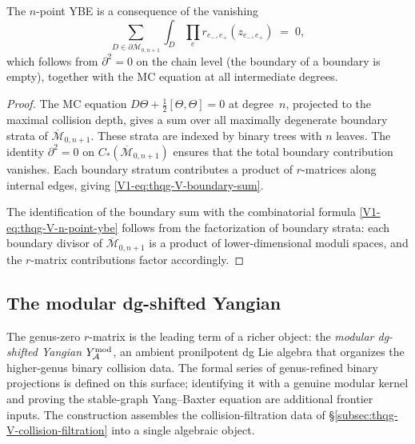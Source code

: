 \begin{proposition}
The $n$-point YBE is a consequence of the vanishing
\begin{equation}%
\sum_{D \in \partial\overline{\mathcal{M}}_{0,n+1}}
\int_D
\prod_{e}
r_{e_-,e_+}(z_{e_-,e_+})
\;=\; 0,
\end{equation}
which follows from $\partial^2 = 0$ on the chain level
\textup{(}the boundary of a boundary is empty\textup{)}, together
with the MC equation at all intermediate degrees.
\end{proposition}

\begin{proof}
The MC equation $D\Theta + \tfrac{1}{2}[\Theta,\Theta] = 0$ at
degree~$n$, projected to the maximal collision depth, gives a sum over
all maximally degenerate boundary strata of
$\overline{\mathcal{M}}_{0,n+1}$. These strata are indexed by binary
trees with $n$ leaves. The identity $\partial^2 = 0$ on
$C_*(\overline{\mathcal{M}}_{0,n+1})$ ensures that the total
boundary contribution vanishes. Each boundary stratum contributes a
product of $r$-matrices along internal edges, giving
\eqref{V1-eq:thqg-V-boundary-sum}.

The identification of the boundary sum with the combinatorial formula
\eqref{V1-eq:thqg-V-n-point-ybe} follows from the factorization of
boundary strata: each boundary divisor of $\overline{\mathcal{M}}_{0,n+1}$
is a product of lower-dimensional moduli spaces, and the $r$-matrix
contributions factor accordingly.
\end{proof}


%
%

\subsection{The modular dg-shifted Yangian}

The genus-zero $r$-matrix is the leading term of a richer object:
the \emph{modular dg-shifted Yangian} $Y^{\mathrm{mod}}_{\mathcal{A}}$, an ambient
pronilpotent dg Lie algebra that organizes the higher-genus binary
collision data. The formal series of genus-refined binary
projections is defined on this surface; identifying it with a genuine
modular kernel and proving the stable-graph Yang--Baxter equation are
additional frontier inputs. The construction assembles the
collision-filtration data of
\S\ref{subsec:thqg-V-collision-filtration} into a single algebraic
object.

